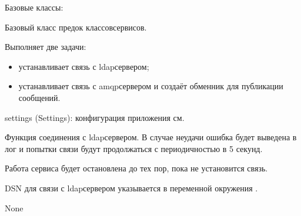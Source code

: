 \documentclass[a4paper,10pt,russian]{sphinxmanual}
\begin{document}
\begin{fulllineitems}

\pysigstartsignatures
{}
\pysigstopsignatures
\sphinxAtStartPar
Базовые классы: 

\sphinxAtStartPar
Базовый класс  \sphinxhyphen{} предок классов\sphinxhyphen{}сервисов.

\sphinxAtStartPar
Выполняет две задачи:
\begin{itemize}
\item {}
\sphinxAtStartPar
устанавливает связь с ldap\sphinxhyphen{}сервером;

\item {}
\sphinxAtStartPar
устанавливает связь с amqp\sphinxhyphen{}сервером и создаёт обменник для публикации
сообщений.

\end{itemize}
\begin{description}
\sphinxAtStartPar
settings (Settings): конфигурация приложения см. 

\end{description}


\begin{fulllineitems}

\pysigstartsignatures
{}
\pysigstopsignatures
\sphinxAtStartPar
Функция соединения с ldap\sphinxhyphen{}сервером.
В случае неудачи ошибка будет выведена в лог и попытки связи будут
продолжаться с периодичностью в 5 секунд.

\sphinxAtStartPar
Работа сервиса будет остановлена до тех пор, пока не установится
связь.

\sphinxAtStartPar
DSN для связи с ldap\sphinxhyphen{}сервером указывается в переменной окружения
.
\begin{description}
\sphinxAtStartPar
None

\end{description}


\end{fulllineitems}
\end{fulllineitems}
\end{document}
